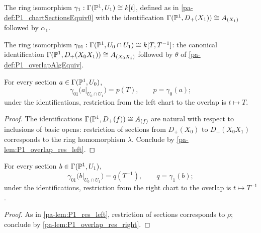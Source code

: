 \begin{definition}
  \label{pa-def:P1_chartSectionsEquiv1}
  \leanok

  The ring isomorphism \(\gamma_1 : \Gamma(\mathbb{P}^1, U_1) \cong k[t]\), defined as in
  \ref{pa-def:P1_chartSectionsEquiv0} with the identification
  \(\Gamma(\mathbb{P}^1, D_+(X_1)) \cong A_{(X_1)}\) followed by \(\alpha_1\).
\end{definition}

\begin{definition}
  \label{pa-def:P1_overlapSectionsEquiv}
  \leanok

  The ring isomorphism \(\gamma_{01} : \Gamma(\mathbb{P}^1, U_0 \cap U_1) \cong k[T, T^{-1}]\): the
  canonical identification \(\Gamma(\mathbb{P}^1, D_+(X_0X_1)) \cong A_{(X_0X_1)}\) followed by
  \(\theta\) of \ref{pa-def:P1_overlapAlgEquiv}.
\end{definition}

\begin{lemma}
  \label{pa-lem:P1_res_left}
  \leanok

  For every section \(a \in \Gamma(\mathbb{P}^1, U_0)\),
  \[
    \gamma_{01}\bigl(a|_{U_0 \cap U_1}\bigr) = p(T), \qquad p = \gamma_0(a);
  \]
  under the identifications, restriction from the left chart to the overlap is
  \(t \mapsto T\).
\end{lemma}
\begin{proof}
  \leanok
  The identifications \(\Gamma(\mathbb{P}^1, D_+(f)) \cong A_{(f)}\) are natural with respect to
  inclusions of basic opens: restriction of sections from \(D_+(X_0)\) to \(D_+(X_0X_1)\)
  corresponds to the ring homomorphism \(\lambda\). Conclude by
  \ref{pa-lem:P1_overlap_res_left}.
\end{proof}

\begin{lemma}
  \label{pa-lem:P1_res_right}
  \leanok

  For every section \(b \in \Gamma(\mathbb{P}^1, U_1)\),
  \[
    \gamma_{01}\bigl(b|_{U_0 \cap U_1}\bigr) = q(T^{-1}), \qquad q = \gamma_1(b);
  \]
  under the identifications, restriction from the right chart to the overlap is
  \(t \mapsto T^{-1}\).
\end{lemma}
\begin{proof}
  \leanok
  As in \ref{pa-lem:P1_res_left}, restriction of sections corresponds to \(\rho\); conclude by
  \ref{pa-lem:P1_overlap_res_right}.
\end{proof}

